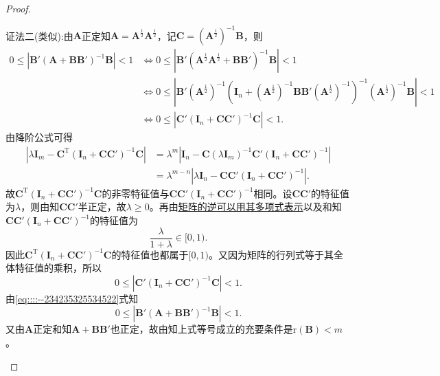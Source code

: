 \documentclass[../../main.tex]{subfiles}
\begin{document}
\begin{proof}
\begin{enumerate}[(1)]
{\color{blue}证法二(类似):}由$\boldsymbol{A}$正定知$\boldsymbol{A} = \boldsymbol{A}^{\frac{1}{2}}\boldsymbol{A}^{\frac{1}{2}}$，记$\boldsymbol{C} = \left( \boldsymbol{A}^{\frac{1}{2}} \right)^{-1}\boldsymbol{B}$，则
\begin{align}
0 \leqslant \left| \boldsymbol{B}' \left( \boldsymbol{A} + \boldsymbol{BB}' \right)^{-1}\boldsymbol{B} \right| < 1
&\Longleftrightarrow 0 \leqslant \left| \boldsymbol{B}' \left( \boldsymbol{A}^{\frac{1}{2}}\boldsymbol{A}^{\frac{1}{2}} + \boldsymbol{BB}' \right)^{-1}\boldsymbol{B} \right| < 1 \nonumber \\
&\Longleftrightarrow 0 \leqslant \left| \boldsymbol{B}' \left( \boldsymbol{A}^{\frac{1}{2}} \right)^{-1} \left( \boldsymbol{I}_n + \left( \boldsymbol{A}^{\frac{1}{2}} \right)^{-1}\boldsymbol{BB}' \left( \boldsymbol{A}^{\frac{1}{2}} \right)^{-1} \right)^{-1} \left( \boldsymbol{A}^{\frac{1}{2}} \right)^{-1}\boldsymbol{B} \right| < 1 \nonumber \\
&\Longleftrightarrow 0 \leqslant \left| \boldsymbol{C}' \left( \boldsymbol{I}_n + \boldsymbol{CC}' \right)^{-1}\boldsymbol{C} \right| < 1. \label{eq::::--234235325534522}
\end{align}
由降阶公式可得
\begin{align*}
\left| \lambda \boldsymbol{I}_m - \boldsymbol{C}^{\mathrm{T}} \left( \boldsymbol{I}_n + \boldsymbol{CC}' \right)^{-1}\boldsymbol{C} \right| &= \lambda^m \left| \boldsymbol{I}_n - \boldsymbol{C} \left( \lambda \boldsymbol{I}_m \right)^{-1}\boldsymbol{C}' \left( \boldsymbol{I}_n + \boldsymbol{CC}' \right)^{-1} \right| \\
&= \lambda^{m-n} \left| \lambda \boldsymbol{I}_n - \boldsymbol{CC}' \left( \boldsymbol{I}_n + \boldsymbol{CC}' \right)^{-1} \right|.
\end{align*}
故$\boldsymbol{C}^{\mathrm{T}} \left( \boldsymbol{I}_n + \boldsymbol{CC}' \right)^{-1}\boldsymbol{C}$的非零特征值与$\boldsymbol{CC}' \left( \boldsymbol{I}_n + \boldsymbol{CC}' \right)^{-1}$相同。设$\boldsymbol{CC}'$的特征值为$\lambda$，则由知$\boldsymbol{CC}'$半正定，故$\lambda \geqslant 0$。再由\hyperref[proposition:矩阵的逆可以用其多项式表示]{矩阵的逆可以用其多项式表示}以及和知$\boldsymbol{CC}' \left( \boldsymbol{I}_n + \boldsymbol{CC}' \right)^{-1}$的特征值为
$$\frac{\lambda}{1 + \lambda} \in [0, 1).$$
因此$\boldsymbol{C}^{\mathrm{T}} \left( \boldsymbol{I}_n + \boldsymbol{CC}' \right)^{-1}\boldsymbol{C}$的特征值也都属于$[0, 1)$。又因为矩阵的行列式等于其全体特征值的乘积，所以
$$0 \leqslant \left| \boldsymbol{C}' \left( \boldsymbol{I}_n + \boldsymbol{CC}' \right)^{-1}\boldsymbol{C} \right| < 1.$$
由\eqref{eq::::--234235325534522}式知
$$0 \leqslant \left| \boldsymbol{B}' \left( \boldsymbol{A} + \boldsymbol{BB}' \right)^{-1}\boldsymbol{B} \right| < 1.$$
又由$\boldsymbol{A}$正定和知$\boldsymbol{A} + \boldsymbol{BB}'$也正定，故由知上式等号成立的充要条件是$\mathrm{r}\left( \boldsymbol{B} \right) < m$。


\end{enumerate}
\end{proof}
\end{document}
